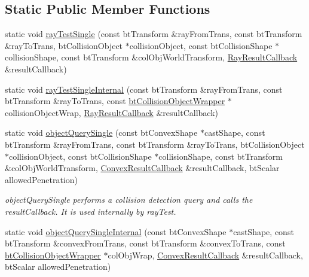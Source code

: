 \subsection*{Static Public Member Functions}
\begin{DoxyCompactItemize}
\item 
static void \hyperlink{classbtCollisionWorld_aca2a9413508b4a2449fe83ff93ea564e}{ray\+Test\+Single} (const bt\+Transform \&ray\+From\+Trans, const bt\+Transform \&ray\+To\+Trans, bt\+Collision\+Object $\ast$collision\+Object, const bt\+Collision\+Shape $\ast$collision\+Shape, const bt\+Transform \&col\+Obj\+World\+Transform, \hyperlink{structbtCollisionWorld_1_1RayResultCallback}{Ray\+Result\+Callback} \&result\+Callback)
\item 
static void \hyperlink{classbtCollisionWorld_a84bbeea09de9dc5c68e49826e58f7114}{ray\+Test\+Single\+Internal} (const bt\+Transform \&ray\+From\+Trans, const bt\+Transform \&ray\+To\+Trans, const \hyperlink{structbtCollisionObjectWrapper}{bt\+Collision\+Object\+Wrapper} $\ast$collision\+Object\+Wrap, \hyperlink{structbtCollisionWorld_1_1RayResultCallback}{Ray\+Result\+Callback} \&result\+Callback)
\item 
\mbox{\label{classbtCollisionWorld_aa63de55ff9451a80c8c825cafd64d9ba}} 
static void \hyperlink{classbtCollisionWorld_aa63de55ff9451a80c8c825cafd64d9ba}{object\+Query\+Single} (const bt\+Convex\+Shape $\ast$cast\+Shape, const bt\+Transform \&ray\+From\+Trans, const bt\+Transform \&ray\+To\+Trans, bt\+Collision\+Object $\ast$collision\+Object, const bt\+Collision\+Shape $\ast$collision\+Shape, const bt\+Transform \&col\+Obj\+World\+Transform, \hyperlink{structbtCollisionWorld_1_1ConvexResultCallback}{Convex\+Result\+Callback} \&result\+Callback, bt\+Scalar allowed\+Penetration)
\begin{DoxyCompactList}\small\item\em object\+Query\+Single performs a collision detection query and calls the result\+Callback. It is used internally by ray\+Test. \end{DoxyCompactList}\item 
static void \hyperlink{classbtCollisionWorld_a2312e2da71f0d7646a4dc19a4966bed0}{object\+Query\+Single\+Internal} (const bt\+Convex\+Shape $\ast$cast\+Shape, const bt\+Transform \&convex\+From\+Trans, const bt\+Transform \&convex\+To\+Trans, const \hyperlink{structbtCollisionObjectWrapper}{bt\+Collision\+Object\+Wrapper} $\ast$col\+Obj\+Wrap, \hyperlink{structbtCollisionWorld_1_1ConvexResultCallback}{Convex\+Result\+Callback} \&result\+Callback, bt\+Scalar allowed\+Penetration)

\end{DoxyCompactItemize}
